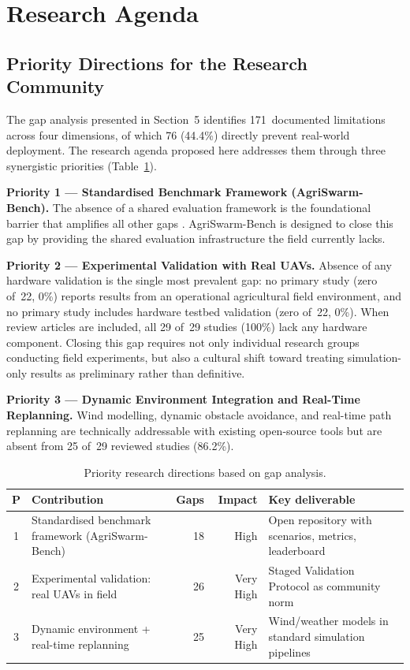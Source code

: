 \documentclass[review,3p]{elsarticle}
\begin{document}
\section{Research Agenda}

\subsection{Priority Directions for the Research Community}

The gap analysis presented in Section~5 identifies 171~documented limitations
across four dimensions, of which 76 (44.4\%) directly prevent real-world
deployment. The research agenda proposed here addresses them through three
synergistic priorities (Table~\ref{tab:priorities}).

\textbf{Priority 1 --- Standardised Benchmark Framework (AgriSwarm-Bench).}
The absence of a shared evaluation framework is the foundational barrier that
amplifies all other gaps \cite{brambilla2013}. AgriSwarm-Bench is designed to
close this gap by providing the shared evaluation infrastructure the field
currently lacks.

\textbf{Priority 2 --- Experimental Validation with Real UAVs.} Absence of
any hardware validation is the single most prevalent gap: no primary study
(zero of~22, 0\%) reports results from an operational agricultural field
environment, and no primary study includes hardware testbed validation
(zero of~22, 0\%). When review articles are included, all 29 of~29 studies
(100\%) lack any hardware component. Closing this gap requires not only
individual research groups conducting field experiments, but also a cultural
shift toward treating simulation-only results as preliminary rather than
definitive.

\textbf{Priority 3 --- Dynamic Environment Integration and Real-Time Replanning.}
Wind modelling, dynamic obstacle avoidance, and real-time path replanning are
technically addressable with existing open-source tools but are absent from
25 of~29 reviewed studies (86.2\%).

\begin{table}[htbp]
\centering
\caption{Priority research directions based on gap analysis.}
\label{tab:priorities}
\begin{tabularx}{\textwidth}{clrrX}
\toprule
\textbf{P} & \textbf{Contribution} & \textbf{Gaps} & \textbf{Impact} & \textbf{Key deliverable} \\
\midrule
1 & Standardised benchmark framework (AgriSwarm-Bench) & 18 & High      & Open repository with scenarios, metrics, leaderboard \tabularnewline
2 & Experimental validation: real UAVs in field         & 26 & Very High & Staged Validation Protocol as community norm \tabularnewline
3 & Dynamic environment + real-time replanning          & 25 & Very High & Wind/weather models in standard simulation pipelines \tabularnewline
\bottomrule
\end{tabularx}
\end{table}
\end{document}
